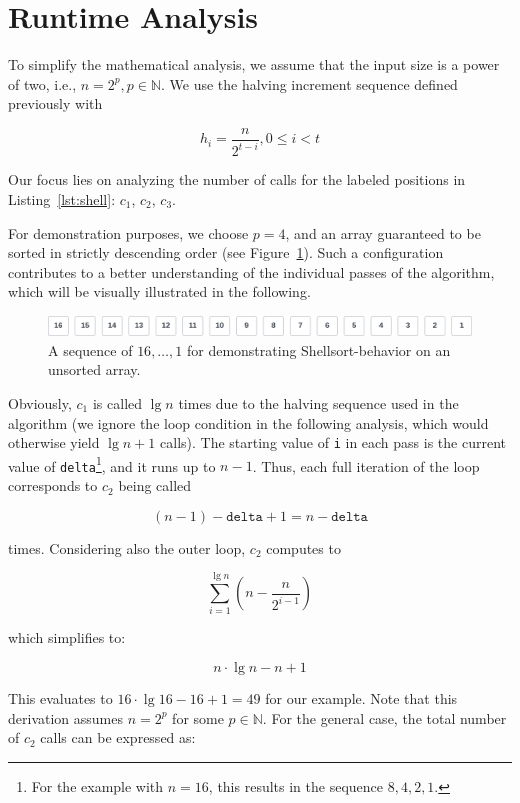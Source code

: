 \section{Runtime Analysis}

To simplify the mathematical analysis, we assume that the input size is a power of two, i.e., $n = 2^p, p \in \mathbb{N}$.
We use the halving increment sequence defined previously with

\[
    h_i = \frac{n}{2^{t-i}}, 0 \leq i < t
\]

\noindent
Our focus lies on analyzing the number of calls for the labeled positions in Listing~\ref{lst:shell}: $c_1$, $c_2$, $c_3$.

For demonstration purposes, we choose $p=4$, and an array guaranteed to be sorted in strictly descending order (see Figure~\ref{fig:bestcase}).
Such a configuration contributes to a better understanding of the individual passes of the algorithm, which will be visually illustrated in the following.
\begin{figure}[!h]
    \centering
    \includegraphics[width=1\columnwidth]{img/bestcase-sequence}
    \caption{A sequence of $16, \ldots, 1$ for demonstrating Shellsort-behavior on an unsorted array.}
    \label{fig:bestcase}
\end{figure}
Obviously, $c_1$ is called $\lg n$ times due to the halving sequence used in the algorithm (we ignore the loop condition in the following analysis, which would otherwise yield $\lg n + 1$ calls).
The starting value of \texttt{i} in each pass is the current value of \texttt{delta}\footnote{
For the example with $n = 16$, this results in the sequence $8, 4, 2, 1$.
}, and it runs up to $n - 1$.
Thus, each full iteration of the loop corresponds to $c_2$ being called

\[
(n - 1) - \texttt{delta} + 1 = n - \texttt{delta}
\]

\noindent
times.
Considering also the outer loop, $c_2$ computes to

\[
\sum_{i=1}^{\lg n} \left( n - \frac{n}{2^{i-1}} \right)
\]

\noindent
which simplifies to:

\[
n \cdot \lg n - n + 1
\]

\noindent
This evaluates to $16 \cdot \lg 16 - 16 + 1 = 49$ for our example.
Note that this derivation assumes $n = 2^p$ for some $p \in \mathbb{N}$.
For the general case, the total number of $c_2$ calls can be expressed as:

